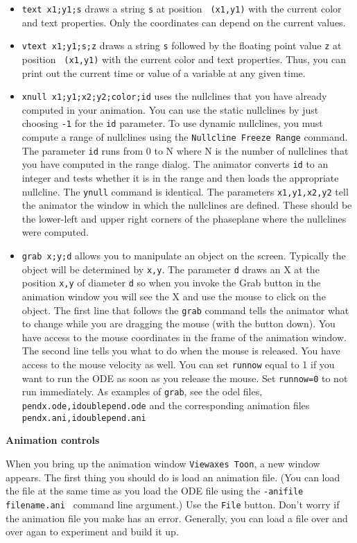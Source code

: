 \documentclass{article}
\begin{document}
\begin{itemize}
\item {\tt text x1;y1;s} draws a string {\tt s} at position {\tt
(x1,y1)} with the current color and text properties. Only the
coordinates can depend on the current values. 

\item {\tt vtext x1;y1;s;z} draws a string {\tt s} followed by
the floating point value {\tt z} at position {\tt
(x1,y1)} with the current color and text properties. Thus, you can
print out the current time or value of a variable at any given time.

\item{\tt xnull x1;y1;x2;y2;color;id} uses the nullclines that you
have already computed in your animation.  You can use the static
nullclines by just choosing {\tt -1} for the {\tt id} parameter.  To
use dynamic nullclines, you must compute a range of nullclines using
the {\tt Nullcline Freeze Range} command.  The parameter {\tt id} runs from
0 to N where N is the number of nullclines that you have computed in
the range dialog.  The animator converts {\tt id} to an integer and
tests whether it is in the range and then loads the appropriate
nullcline. The {\tt ynull} command is
identical. The parameters {\tt x1,y1,x2,y2} tell the animator the
window in which the nullclines are defined.  These should be the
lower-left and upper right corners of the phaseplane where the
nullclines were computed.
\item {\tt grab x;y;d} allows you to manipulate an object on the screen. Typically the object will be determined by {\tt x,y}. The parameter {\tt d} draws an X at the position {\tt x,y} of diameter {\tt d} so when you invoke the Grab button in the animation window you will see the X and use the mouse to click on the object. The first line that follows the {\tt grab} command tells the animator what to change while you are dragging the mouse (with the button down).  You have access to the mouse coordinates in the frame of the animation window. The second line tells you what to do when the mouse is released. You have access to the mouse velocity as well. You can set {\tt runnow} equal to 1 if you want to run the ODE as soon as you release the mouse. Set {\tt runnow=0} to not run immediately. As examples of {\tt grab}, see the odel files, {\tt pendx.ode,idoublepend.ode} and the corresponding animation files {\tt pendx.ani,idoublepend.ani}
\end{itemize}

\bigskip
{\Large \bf Animation controls}

\noindent When you bring up the animation window {\tt Viewaxes Toon}, a new window appears. The first thing you should do is load an animation file. (You can load the file at the same time as you load the ODE file using the {\tt -anifile filename.ani } command line argument.) Use the {\tt File} button. Don't worry if the animation file you make has an error. Generally, you can load a file over and over agan to experiment and build it up.
\end{document}

